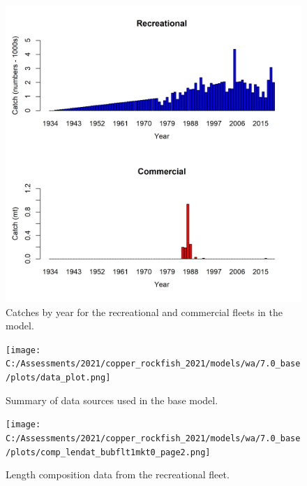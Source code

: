 \documentclass[11pt,
  english,
  a4paper,
]{article}
\begin{document}
\begin{figure}
\centering
\includegraphics[width=1\textwidth,height=1\textheight]{figs/catches_wa.png}
\caption{Catches by year for the recreational and commercial fleets in the model.\label{fig:catch}}
\end{figure}

\tagmcend\tagstructend


\begin{figure}
\centering
\texttt{[image: C:/Assessments/2021/copper\_rockfish\_2021/models/wa/7.0\_base/plots/data\_plot.png]}
\caption{Summary of data sources used in the base model.\label{fig:data-plot}}
\end{figure}

\tagmcend\tagstructend


\begin{figure}
\centering
\texttt{[image: C:/Assessments/2021/copper\_rockfish\_2021/models/wa/7.0\_base/plots/comp\_lendat\_bubflt1mkt0\_page2.png]}
\caption{Length composition data from the recreational fleet.\label{fig:wa-len-data}}
\end{figure}
\end{document}
